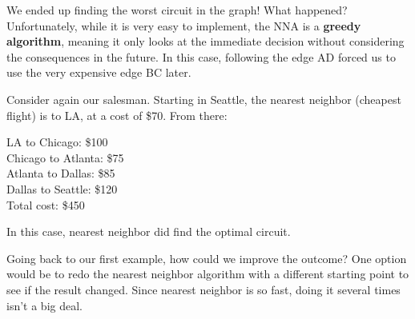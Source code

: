 We ended up finding the worst circuit in the graph!  What happened?  Unfortunately, while it is very easy to implement, the NNA is a \textbf{greedy algorithm}, meaning it only looks at the immediate decision without considering the consequences in the future.  In this case, following the edge AD forced us to use the very expensive edge BC later.

\begin{example}{}%
Consider again our salesman.  Starting in Seattle, the nearest neighbor (cheapest flight) is to LA, at a cost of \$70.  From there:

\begin{minipage}{0.5\textwidth}
\noindent LA to Chicago:  \$100\\
Chicago to Atlanta: \$75\\
Atlanta to Dallas: \$85\\
Dallas to Seattle: \$120\\
Total cost: \$450\\
\end{minipage}
%
\begin{minipage}{0.5\textwidth}
\end{minipage}

\noindent In this case, nearest neighbor did find the optimal circuit.  
\end{example}

Going back to our first example, how could we improve the outcome?  One option would be to redo the nearest neighbor algorithm with a different starting point to see if the result changed.  Since nearest neighbor is so fast, doing it several times isn't a big deal.

